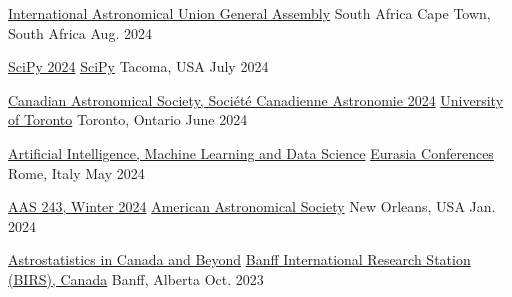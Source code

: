 

\begin{cvhonors}

  \cvhonor
    {\href{https://astronomy2024.org/}{International Astronomical Union General Assembly}} %
    {South Africa} %
    {Cape Town, South Africa} %
    {Aug. 2024} %

  \cvhonor
    {\href{https://www.scipy2024.scipy.org/}{SciPy 2024}} %
    {\href{https://scipy.org/}{SciPy}} %
    {Tacoma, USA} %
    {July 2024} %

  \cvhonor
    {\href{https://cascato.ca/}{Canadian Astronomical Society, Société Canadienne Astronomie 2024}} %
    {\href{https://www.utoronto.ca/}{University of Toronto}} %
    {Toronto, Ontario} %
    {June 2024} %
    
  \cvhonor
    {\href{https://eurasiaconferences.com/events/rome/2024/artificial-intelligence-machine-learning-and-data-science/}{Artificial Intelligence, Machine Learning and Data Science}} %
    {\href{https://eurasiaconferences.com/}{Eurasia Conferences}} %
    {Rome, Italy} %
    {May 2024} %

  \cvhonor
    {\href{https://aas.org/meetings/aas243}{AAS 243, Winter 2024}} %
    {\href{https://aas.org/}{American Astronomical Society}} %
    {New Orleans, USA} %
    {Jan. 2024} %

  \cvhonor
    {\href{https://workshops.birs.ca/events/23w5094}{Astrostatistics in Canada and Beyond}} %
    {\href{https://www.umontreal.ca/}{Banff International Research Station (BIRS), Canada}} %
    {Banff, Alberta} %
    {Oct. 2023} %
    

\end{cvhonors}
